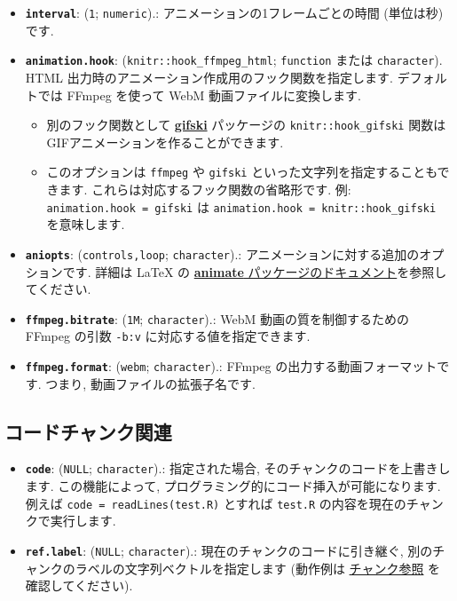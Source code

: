 \documentclass[
  xelatex,ja=standard,jafont=noto]{bxjsreport}
\providecommand{\tightlist}{%
  \setlength{\itemsep}{0pt}\setlength{\parskip}{0pt}}
\begin{document}
\begin{itemize}
\tightlist
\item
  \textbf{\texttt{interval}}: (\texttt{1}; \texttt{numeric}).:
  アニメーションの1フレームごとの時間 (単位は秒) です.
\item
  \textbf{\texttt{animation.hook}}: (\texttt{knitr::hook\_ffmpeg\_html};
  \texttt{function} または \texttt{character}). HTML
  出力時のアニメーション作成用のフック関数を指定します. デフォルトでは
  FFmpeg を使って WebM 動画ファイルに変換します.

  \begin{itemize}
  \tightlist
  \item
    別のフック関数として
    \href{https://cran.r-project.org/package=gifski}{\textbf{gifski}}
    パッケージの \texttt{knitr::hook\_gifski}
    関数はGIFアニメーションを作ることができます.
  \item
    このオプションは \texttt{\textquotesingle{}ffmpeg\textquotesingle{}}
    や \texttt{\textquotesingle{}gifski\textquotesingle{}}
    といった文字列を指定することもできます.
    これらは対応するフック関数の省略形です. 例:
    \texttt{animation.hook\ =\ \textquotesingle{}gifski\textquotesingle{}}
    は \texttt{animation.hook\ =\ knitr::hook\_gifski} を意味します.
  \end{itemize}
\item
  \textbf{\texttt{aniopts}}:
  (\texttt{\textquotesingle{}controls,loop\textquotesingle{}};
  \texttt{character}).: アニメーションに対する追加のオプションです.
  詳細は LaTeX の \href{http://ctan.org/pkg/animate}{\textbf{animate}
  パッケージのドキュメント}を参照してください.
\item
  \textbf{\texttt{ffmpeg.bitrate}}: (\texttt{1M}; \texttt{character}).:
  WebM 動画の質を制御するための FFmpeg の引数 \texttt{-b:v}
  に対応する値を指定できます.
\item
  \textbf{\texttt{ffmpeg.format}}: (\texttt{webm}; \texttt{character}).:
  FFmpeg の出力する動画フォーマットです. つまり,
  動画ファイルの拡張子名です.
\end{itemize}

\hypertarget{code-chunk}{%
\subsection{コードチャンク関連}\label{code-chunk}}

\begin{itemize}
\tightlist
\item
  \textbf{\texttt{code}}: (\texttt{NULL}; \texttt{character}).:
  指定された場合, そのチャンクのコードを上書きします. この機能によって,
  プログラミング的にコード挿入が可能になります. 例えば
  \texttt{code\ =\ readLines(\textquotesingle{}test.R\textquotesingle{})}
  とすれば \texttt{test.R} の内容を現在のチャンクで実行します.
\item
  \textbf{\texttt{ref.label}}: (\texttt{NULL}; \texttt{character}).:
  現在のチャンクのコードに引き継ぐ,
  別のチャンクのラベルの文字列ベクトルを指定します (動作例は
  \protect\hyperlink{reference}{チャンク参照} を確認してください).
\end{itemize}
\end{document}
